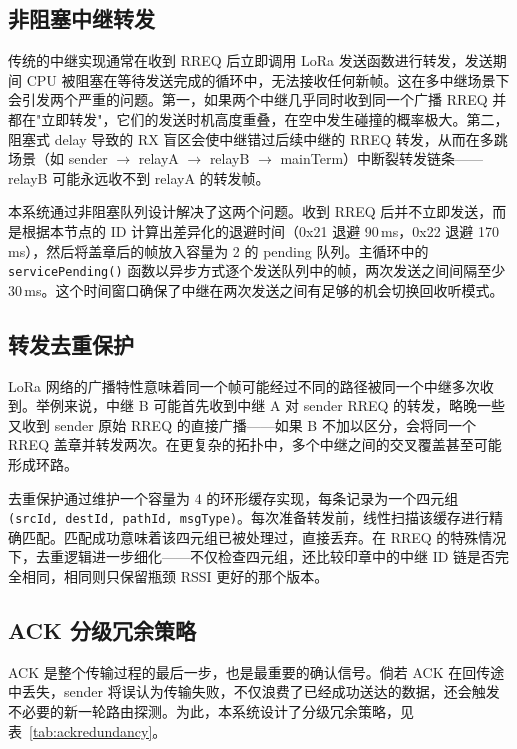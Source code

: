\documentclass[12pt,a4paper]{ctexart}
\begin{document}
\subsection{非阻塞中继转发}

传统的中继实现通常在收到 RREQ 后立即调用 LoRa 发送函数进行转发，发送期间 CPU 被阻塞在等待发送完成的循环中，无法接收任何新帧。这在多中继场景下会引发两个严重的问题。第一，如果两个中继几乎同时收到同一个广播 RREQ 并都在"立即转发"，它们的发送时机高度重叠，在空中发生碰撞的概率极大。第二，阻塞式 delay 导致的 RX 盲区会使中继错过后续中继的 RREQ 转发，从而在多跳场景（如 sender $\to$ relayA $\to$ relayB $\to$ mainTerm）中断裂转发链条——relayB 可能永远收不到 relayA 的转发帧。

本系统通过非阻塞队列设计解决了这两个问题。收到 RREQ 后并不立即发送，而是根据本节点的 ID 计算出差异化的退避时间（0x21 退避 90\,ms，0x22 退避 170\,ms），然后将盖章后的帧放入容量为 2 的 pending 队列。主循环中的 \texttt{servicePending()} 函数以异步方式逐个发送队列中的帧，两次发送之间间隔至少 30\,ms。这个时间窗口确保了中继在两次发送之间有足够的机会切换回收听模式。

\subsection{转发去重保护}

LoRa 网络的广播特性意味着同一个帧可能经过不同的路径被同一个中继多次收到。举例来说，中继 B 可能首先收到中继 A 对 sender RREQ 的转发，略晚一些又收到 sender 原始 RREQ 的直接广播——如果 B 不加以区分，会将同一个 RREQ 盖章并转发两次。在更复杂的拓扑中，多个中继之间的交叉覆盖甚至可能形成环路。

去重保护通过维护一个容量为 4 的环形缓存实现，每条记录为一个四元组 \texttt{(srcId, destId, pathId, msgType)}。每次准备转发前，线性扫描该缓存进行精确匹配。匹配成功意味着该四元组已被处理过，直接丢弃。在 RREQ 的特殊情况下，去重逻辑进一步细化——不仅检查四元组，还比较印章中的中继 ID 链是否完全相同，相同则只保留瓶颈 RSSI 更好的那个版本。

\subsection{ACK 分级冗余策略}

ACK 是整个传输过程的最后一步，也是最重要的确认信号。倘若 ACK 在回传途中丢失，sender 将误认为传输失败，不仅浪费了已经成功送达的数据，还会触发不必要的新一轮路由探测。为此，本系统设计了分级冗余策略，见表~\ref{tab:ackredundancy}。
\end{document}
